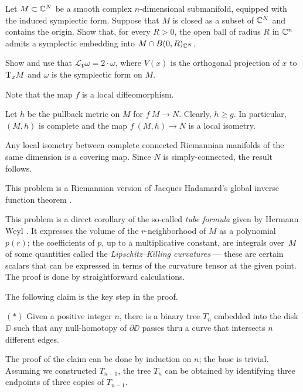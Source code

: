 \begin{pr}
Let $M\subset\mathbb{C}^N$ be a smooth complex $n$-dimensional submanifold, equipped with the induced symplectic form.
Suppose that $M$ is closed as a subset of $\mathbb{C}^N$ and contains the origin.
Show that, for every $R>0$, the open ball of radius $R$ in $\mathbb{C}^n$ admits a symplectic embedding into $M\cap B(0,R)_{\mathbb{C}^N}$.
\end{pr}

Show and use that $\mathcal{L}_V\omega=2\cdot \omega$, where $V(x)$ is the orthogonal projection of $x$ to $\mathrm{T}_x M$ and $\omega$ is the symplectic form on $M$.


Note that the map $f$ is a local diffeomorphism.

Let $h$ be the pullback metric on $M$ for $f\:M\to N$.
Clearly, $h\ge g$.
In particular, $(M,h)$ is complete and the map $f\:(M,h)\to N$ is a local isometry. 

Any local isometry between complete connected Riemannian manifolds of the same dimension is a covering map.
Since $N$ is simply-connected, the result follows.
\qeds 

This problem is a Riemannian version of Jacques Hadamard's global inverse function theorem \cite{hadamard1906,ohkita-tsukamot}.

This problem is a direct corollary of the so-called \emph{tube formula} given by Hermann Weyl \cite{weyl}.
It expresses the volume of the $r$-neighborhood of $M$ as a polynomial $p(r)$;
the coefficients of $p$, up to a multiplicative constant, are integrals over~$M$ of some quantities called the \emph{Lipschitz--Killing curvatures} --- these are certain scalars that can be expressed in terms of the curvature tensor at the given point.
The proof is done by straightforward calculations.

 


The following claim is the key step in the proof.
\begin{cl}{$({*})$}
Given a positive integer $n$, there is a binary tree $T_n$ embedded into the disk $\DD$ such that any null-homotopy of $\partial \DD$ passes thru a curve that intersects $n$ different edges.
\end{cl}


The proof of the claim can be done by induction on $n$; the base is trivial.
Assuming we constructed $T_{n-1}$, the tree $T_n$ can be obtained by identifying three endpoints of three copies of $T_{n-1}$.

